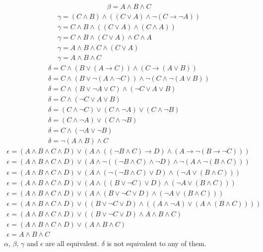 \documentclass[fleqn]{article}
\begin{document}
\begin{enumerate}
\begin{gather*}
		\beta = A \land B \land C
	\end{gather*}
	\begin{gather*}
		\gamma = (C \land B) \land ((C \lor A) \land \lnot (C \rightarrow \lnot A)) \\
		\gamma = C \land B \land ((C \lor A) \land (C \land A)) \\
		\gamma = C \land B \land (C \lor A) \land C \land A \\
		\gamma = A \land B \land C \land (C \lor A) \\
		\gamma = A \land B \land C
	\end{gather*}
	\begin{gather*}
		\delta = C \land (B \lor (A \rightarrow C)) \land (C \rightarrow (A \lor B)) \\
		\delta = C \land (B \lor \lnot (A \land \lnot C)) \land \lnot (C \land \lnot (A \lor B)) \\
		\delta = C \land (B \lor \lnot A \lor C) \land (\lnot C \lor A \lor B) \\
		\delta = C \land (\lnot C \lor A \lor B) \\
		\delta = (C \land \lnot C) \lor (C \land \lnot A) \lor (C \land \lnot B) \\
		\delta = (C \land \lnot A) \lor (C \land \lnot B) \\
		\delta = C \land (\lnot A \lor \lnot B) \\
		\delta = \lnot (A \land B) \land C
	\end{gather*}
	\begin{gather*}
		\epsilon = (A \land B \land C \land D) \lor (A \land ((\lnot B \land C) \rightarrow D) \land (A \rightarrow \lnot (B \rightarrow \lnot C))) \\
		\epsilon = (A \land B \land C \land D) \lor (A \land \lnot ((\lnot B \land C) \land \lnot D) \land \lnot (A \land \lnot (B \land C))) \\
		\epsilon = (A \land B \land C \land D) \lor (A \land (\lnot (\lnot B \land C) \lor D) \land (\lnot A \lor (B \land C))) \\
		\epsilon = (A \land B \land C \land D) \lor (A \land ((B \lor \lnot C) \lor D) \land (\lnot A \lor (B \land C))) \\
		\epsilon = (A \land B \land C \land D) \lor (A \land (B \lor \lnot C \lor D) \land (\lnot A \lor (B \land C))) \\
		\epsilon = (A \land B \land C \land D) \lor ((B \lor \lnot C \lor D) \land ((A \land \lnot A) \lor (A \land (B \land C)))) \\
		\epsilon = (A \land B \land C \land D) \lor ((B \lor \lnot C \lor D) \land A \land B \land C) \\
		\epsilon = (A \land B \land C \land D) \lor (A \land B \land C) \\
		\epsilon = A \land B \land C
	\end{gather*}
	\(\alpha\), \(\beta\), \(\gamma\) and \(\epsilon\) are all equivalent. \(\delta\) is not equivalent to any of them.
\end{enumerate}
	
\end{document}
